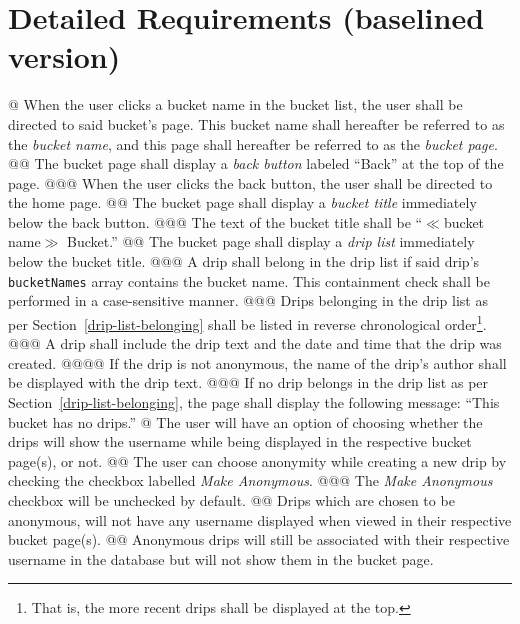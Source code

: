 \documentclass{article}
\begin{document}
\section*{Detailed Requirements (baselined version)}

\begin{easylist}[articletoc]
@ When the user clicks a bucket name in the bucket list, the user shall be directed to said bucket's page. This bucket name shall hereafter be referred to as the \textit{bucket name}, and this page shall hereafter be referred to as the \textit{bucket page}.
@@ The bucket page shall display a \textit{back button} labeled ``Back'' at the top of the page.
@@@ When the user clicks the back button, the user shall be directed to the home page.
@@ The bucket page shall display a \textit{bucket title} immediately below the back button.
@@@ The text of the bucket title shall be ``$\ll$bucket name$\gg$ Bucket.''
@@ The bucket page shall display a \textit{drip list} immediately below the bucket title.
@@@ \label{drip-list-belonging}A drip shall belong in the drip list if said drip's \texttt{bucketNames} array contains the bucket name. This containment check shall be performed in a case-sensitive manner.
@@@ Drips belonging in the drip list as per Section~\ref{drip-list-belonging} shall be listed in reverse chronological order\footnote{That is, the more recent drips shall be displayed at the top.}.
@@@ A drip shall include the drip text and the date and time that the drip was created.
@@@@ If the drip is not anonymous, the name of the drip's author shall be displayed with the drip text.
@@@ If no drip belongs in the drip list as per Section~\ref{drip-list-belonging}, the page shall display the following message: ``This bucket has no drips.''
@ The user will have an option of choosing whether the drips will show the username while being displayed in the respective bucket page(s), or not.
@@ The user can choose anonymity while creating a new drip by checking the checkbox labelled \textit{Make Anonymous}.
@@@ The \textit{Make Anonymous} checkbox will be unchecked by default.
@@ Drips which are chosen to be anonymous, will not have any username displayed when viewed in their respective bucket page(s).
@@ Anonymous drips will still be associated with their respective username in the database but will not show them in the bucket page.

\end{easylist}
\end{document}
